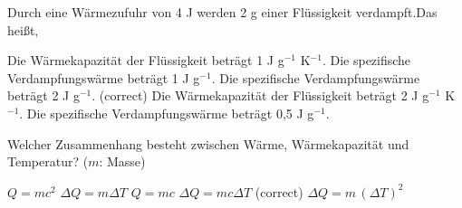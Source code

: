 \documentclass[11pt]{exam}
\begin{document}
\begin{questions}
\vspace{3mm}\question Durch eine Wärmezufuhr von 4 J werden 2 g einer Flüssigkeit verdampft.Das heißt,

\begin{choices}
	\choice Die Wärmekapazität der Flüssigkeit beträgt 1 J g\(^{-1}\) K\(^{-1}\).
	\choice Die spezifische Verdampfungswärme beträgt 1 J g\(^{-1}\).
	\choice Die spezifische Verdampfungswärme beträgt 2 J g\(^{-1}\). (correct)
	\choice Die Wärmekapazität der Flüssigkeit beträgt 2 J g\(^{-1}\) K\(^{-1}\).
	\choice Die spezifische Verdampfungswärme beträgt 0,5 J g\(^{-1}\).
\end{choices}

\vspace{3mm}\question Welcher Zusammenhang besteht zwischen Wärme, Wärmekapazität und Temperatur? (\(m\): Masse)

\begin{choices}
	\choice \(Q = m c^2\)
	\choice \(\Delta Q = m \Delta T\)
	\choice \(Q = m c\)
	\choice \(\Delta Q = m c \Delta T\) (correct)
	\choice \(\Delta Q = m \, (\Delta T)^2\)
\end{choices}

\vspace{3mm}\end{questions}
\end{document}
